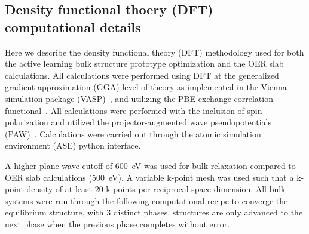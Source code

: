 


\subsection{Density functional thoery (DFT) computational details}

%
Here we describe the density functional theory (DFT) methodology used for both the active learning bulk structure prototype optimization and the OER slab calculations.
%
All calculations were performed using DFT at the generalized gradient approximation (GGA) level of theory as implemented in the Vienna  simulation package (VASP)~\cite{Kresse1995,Kresse1996_0,Kresse1996_1},
and utilizing the PBE exchange-correlation functional~\cite{Perdew1996}.
%
All calculations were performed with the inclusion of spin-polarization and utilized the projector-augmented wave pseudopotentials (PAW)~\cite{Blochl1994}.
%
Calculations were carried out through the atomic simulation environment (ASE) python interface.~\cite{HjorthLarsen2017}
%


%
%
A higher plane-wave cutoff of \SI{600}{\electronvolt} was used for bulk relaxation compared to OER slab calculations (\SI{500}{\electronvolt}).
%
A variable k-point mesh was used such that a k-point density of at least \num{20} k-points per reciprocal space dimension.
%
All bulk systems were run through the following computational recipe to converge the equilibrium structure, with \num{3} distinct phases.
%
structures are only advanced to the next phase when the previous phase completes without error.


